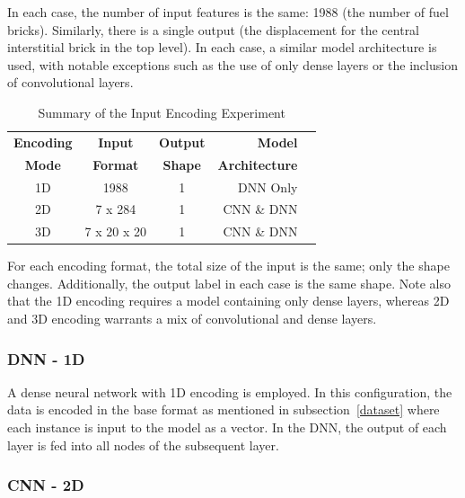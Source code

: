 \noindent
In each case, the number of input features is the same: 1988 (the number of fuel bricks). Similarly, there is a single output (the displacement for the central interstitial brick in the top level). In each case, a similar model architecture is used, with notable exceptions such as the use of only dense layers or the inclusion of convolutional layers.

\begin{table}[h!]
	\begin{center}
		
		\begin{tabular}{c|c|c|r|c} %
			\textbf{Encoding} & \textbf{Input} & \textbf{Output} & \textbf{Model} \\
			
			\textbf{Mode} & \textbf{Format} & \textbf{Shape} & \textbf{Architecture} \\
			\hline
			1D & 1988 & 1 & DNN Only \\
			2D & 7 x 284 &  1 & CNN \& DNN \\
			3D & 7 x 20 x 20 &  1 & CNN \& DNN \\
			
		\end{tabular}
		\caption{Summary of the Input Encoding Experiment} {For each encoding format, the total size of the input is the same; only the shape changes. Additionally, the output label in each case is the same shape. Note also that the 1D encoding requires a model containing only dense layers, whereas 2D and 3D encoding warrants a mix of convolutional and dense layers. }
		\label{tab:encodings}
	\end{center}
\end{table}

\subsubsection{DNN - 1D}

A dense neural network with 1D encoding is employed. In this configuration, the data is encoded in the base format as mentioned in subsection~\ref{dataset} where each instance is input to the model as a vector. In the DNN, the output of each layer is fed into all nodes of the subsequent layer.

\subsubsection{CNN - 2D}

